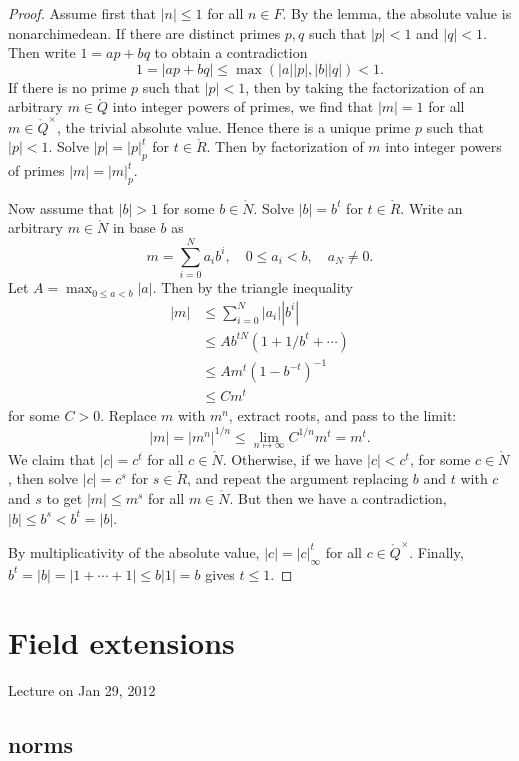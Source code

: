\documentclass{amsart}
\def\abs#1{{|#1|}}
\begin{document}
\begin{proof}
Assume first that $\abs{n}\le 1$ for all $n\in F$.  By the lemma, the
absolute value is nonarchimedean.  If there are  distinct primes $p,q$
such that $\abs{p}<1$ and $\abs{q}<1$. Then write $1 = a p + b q$ to obtain
a contradiction
\[
1 = \abs{a p + b q} \le \max(\abs{a}\abs{p},\abs{b}\abs{q}) < 1.
\]
If there is no prime $p$ such that $\abs{p}<1$, then by taking the
factorization of an arbitrary $m\in\ring{Q}$ into integer powers of
primes, we find that $\abs{m}=1$ for all $m\in\ring{Q}^\times$, the
trivial absolute value.  Hence there is a unique prime $p$ such that
$\abs{p}<1$.  Solve $\abs{p}=\abs{p}_p^t$ for $t\in\ring{R}$.  Then by
factorization of $m$ into integer powers of primes
$\abs{m}=\abs{m}_p^t$.

Now assume that $\abs{b}>1$ for some $b\in\ring{N}$.  Solve $\abs{b}=b^t$
for $t\in\ring{R}$.  Write an arbitrary
$m\in\ring{N}$ in base $b$ as
\[
m = \sum_{i=0}^N a_i b^i,\quad 0\le a_i < b,\quad a_N\ne 0.
\] 
Let $A = \max_{0\le a < b} \abs{a}$.
Then by the triangle inequality
\begin{align*}
\abs{m} &\le \sum_{i=0}^N \abs{a_i} \abs{b^i} \\
  &\le A b^{t N} (1+1/b^t+\cdots)\\
  &\le A m^t (1-b^{-t})^{-1}\\
  &\le C m^t
\end{align*}
for some $C>0$.
Replace $m$ with $m^n$,  extract roots, and pass to the limit:
\[
\abs{m}=\abs{m^n}^{1/n}\le \lim_{n\mapsto\infty} C^{1/n} m^t = m^t.
\]
We claim that $\abs{c}=c^t$ for all $c\in\ring{N}$.
Otherwise, if we have $\abs{c} < c^t$, for some $c\in\ring{N}$, then solve $\abs{c}=c^s$
for $s\in\ring{R}$, and repeat the argument replacing $b$ and $t$ with $c$ and $s$
to get $\abs{m} \le m^s$ for all $m\in\ring{N}$.  But then we have a contradiction,
$\abs{b}\le b^s < b^t=\abs{b}$. 

By multiplicativity of the absolute value, $\abs{c}=\abs{c}_\infty^t$ for all
$c\in\ring{Q}^\times$.
Finally, $b^t=\abs{b}=\abs{1+\cdots+1} \le b\abs{1} = b$ gives $t\le 1$.
\end{proof}

\newpage
\section{Field extensions}

Lecture on Jan 29, 2012

\subsection{norms}
\end{document}
